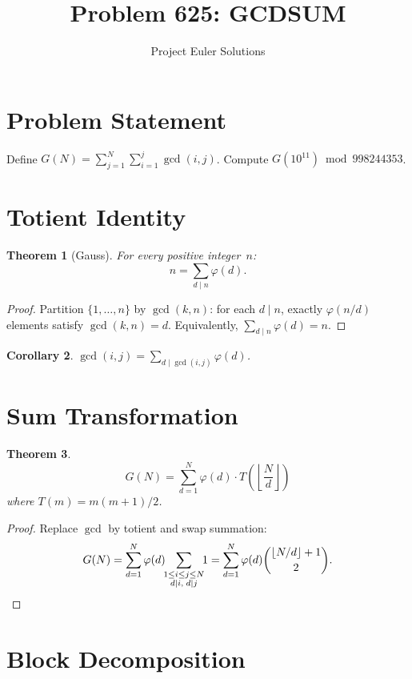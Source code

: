 \documentclass[11pt]{article}
\title{Problem 625: GCDSUM}
\author{Project Euler Solutions}
\date{}
\newtheorem{theorem}{Theorem}
\newtheorem{corollary}[theorem]{Corollary}
\begin{document}
\maketitle

\section{Problem Statement}

Define $G(N) = \sum_{j=1}^{N}\sum_{i=1}^{j}\gcd(i,j)$. Compute $G(10^{11}) \bmod 998244353$.

\section{Totient Identity}

\begin{theorem}[Gauss]
For every positive integer~$n$:
\[
n = \sum_{d \mid n} \varphi(d).
\]
\end{theorem}

\begin{proof}
Partition $\{1, \ldots, n\}$ by $\gcd(k, n)$: for each $d \mid n$, exactly $\varphi(n/d)$ elements satisfy $\gcd(k,n) = d$. Equivalently, $\sum_{d \mid n}\varphi(d) = n$.
\end{proof}

\begin{corollary}
$\gcd(i,j) = \sum_{d \mid \gcd(i,j)} \varphi(d)$.
\end{corollary}

\section{Sum Transformation}

\begin{theorem}
\[
G(N) = \sum_{d=1}^{N} \varphi(d) \cdot T\!\left(\left\lfloor\frac{N}{d}\right\rfloor\right)
\]
where $T(m) = m(m+1)/2$.
\end{theorem}

\begin{proof}
Replace $\gcd$ by totient and swap summation:
\[
G(N) = \sum_{d=1}^N \varphi(d) \!\!\sum_{\substack{1 \le i \le j \le N \\ d \mid i,\; d \mid j}} \!\!1 = \sum_{d=1}^N \varphi(d) \binom{\lfloor N/d\rfloor + 1}{2}. \qedhere
\]
\end{proof}

\section{Block Decomposition}
\end{document}
